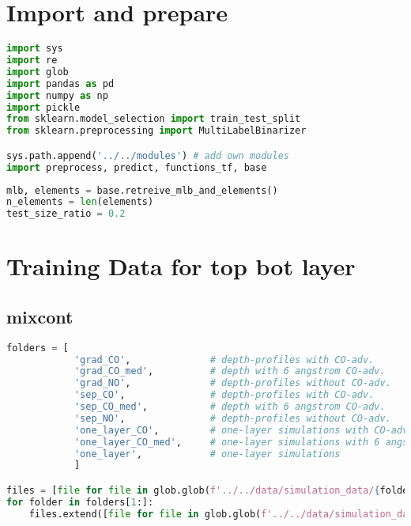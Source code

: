 \hypertarget{import-and-prepare}{%
\section*{Import and prepare}\label{import-and-prepare}}

\begin{lstlisting}[language=Python]
import sys
import re
import glob
import pandas as pd
import numpy as np
import pickle
from sklearn.model_selection import train_test_split
from sklearn.preprocessing import MultiLabelBinarizer

sys.path.append('../../modules') # add own modules
import preprocess, predict, functions_tf, base
\end{lstlisting}

\begin{lstlisting}[language=Python]
mlb, elements = base.retreive_mlb_and_elements()
n_elements = len(elements)
test_size_ratio = 0.2
\end{lstlisting}

\hypertarget{training-data-for-top-bot-layer}{%
\section*{Training Data for top bot
layer}\label{training-data-for-top-bot-layer}}

\hypertarget{mixcont}{%
\subsection*{mixcont}\label{mixcont}}

\begin{lstlisting}[language=Python]
folders = [
            'grad_CO',              # depth-profiles with CO-adv.       with gradient layers
            'grad_CO_med',          # depth with 6 angstrom CO-adv.       with gradient layers
            'grad_NO',              # depth-profiles without CO-adv.    with gradient layers
            'sep_CO',               # depth-profiles with CO-adv.       with separated layers
            'sep_CO_med',           # depth with 6 angstrom CO-adv.       with separated layers
            'sep_NO',               # depth-profiles without CO-adv.    with separated layers
            'one_layer_CO',         # one-layer simulations with CO-adv.
            'one_layer_CO_med',     # one-layer simulations with 6 angstrom CO-adv.
            'one_layer',            # one-layer simulations
            ]

files = [file for file in glob.glob(f'../../data/simulation_data/{folders[0]}/*.spc')]
for folder in folders[1:]:
    files.extend([file for file in glob.glob(f'../../data/simulation_data/{folder}/*.spc')])
\end{lstlisting}

